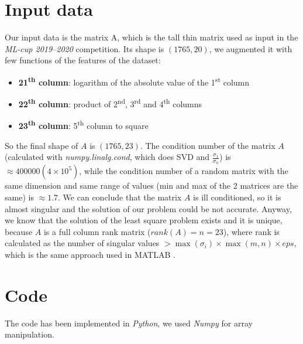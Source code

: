\documentclass{article}
\begin{document}
\section{Input data}\label{sec:input-data}
Our input data is the matrix A, which is the tall thin matrix used as input in the \textit{ML-cup 2019--2020} competition.
Its shape is $(1765, 20)$, we augmented it with few functions of the features of the dataset:
\begin{itemize}
	\item \textbf{21\textsuperscript{th} column}: logarithm of the absolute value of the 1\textsuperscript{st} column
	\item \textbf{22\textsuperscript{th} column}: product of 2\textsuperscript{nd}, 3\textsuperscript{rd} and 4\textsuperscript{th} columns
	\item \textbf{23\textsuperscript{th} column}: 5\textsuperscript{th} column to square
\end{itemize}
So the final shape of $A$ is $(1765, 23)$.
    The condition number of the matrix $A$ (calculated with \textit{numpy.linalg.cond}, which does SVD and $\frac{\sigma_{1}}{\sigma_{n}}$) is $\approx 400000 (4 \times 10^{5})$, while the condition number of a random matrix with the same dimension and same range of values (min and max of the 2 matrices are the same) is $\approx 1.7$.
    We can conclude that the matrix $A$ is ill conditioned, so it is almost singular and the solution of our problem could be not accurate.
    Anyway, we know that the solution of the least square problem exists and it is unique, because $A$ is a full column rank matrix ($rank(A) = n = 23$), where rank is calculated as the number of singular values $> \max(\sigma_{i}) \times \max(m, n) \times eps$, which is the same approach used in MATLAB .

\section{Code}\label{sec:code}
The code has been implemented in \textit{Python}, we used \textit{Numpy} for array manipulation.
\end{document}

